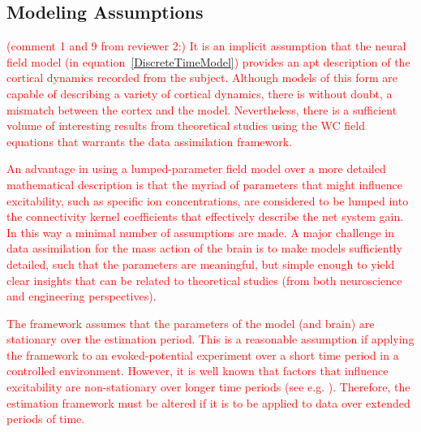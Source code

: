 \documentclass[review,authoryear,3p]{elsarticle}
\newcommand{\dean}[1]{\textcolor{red}{#1}}
\newcommand{\parham}[1]{\textcolor{blue}{#1}}
\begin{document}
\subsection{Modeling Assumptions}
\dean{(comment 1 and 9 from reviewer 2:) It is an implicit assumption that the neural field model (in equation~\ref{DiscreteTimeModel}) provides an apt description of the cortical dynamics recorded from the subject. Although models of this form are capable of describing a variety of cortical dynamics, there is without doubt, a mismatch between the cortex and the model. Nevertheless, there is a sufficient volume of interesting results from theoretical studies using the WC field equations that warrants the data assimilation framework. }

\dean{An advantage in using a lumped-parameter field model over a more detailed mathematical description is that the myriad of parameters that might influence excitability, such as specific ion concentrations, are considered to be lumped into the connectivity kernel coefficients that effectively describe the net system gain. In this way a minimal number of assumptions are made. A major challenge in data assimilation for the mass action of the brain is to make models sufficiently detailed, such that the parameters are meaningful, but simple enough to yield clear insights that can be related to theoretical studies (from both neuroscience and engineering perspectives).}

\dean{The framework assumes that the parameters of the model (and brain) are stationary over the estimation period. This is a reasonable assumption if applying the framework to an evoked-potential experiment over a short time period in a controlled environment. However, it is well known that factors that influence excitability are non-stationary over longer time periods (see e.g. \citet{Ullah2010}). Therefore, the estimation framework must be altered if it is to be applied to data over extended periods of time.} 

\end{document}
